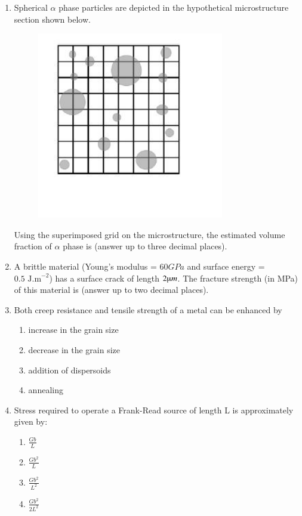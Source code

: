 \documentclass[journal]{IEEEtran}
\theoremstyle{remark}
\begin{document}
\begin{enumerate}
\item Spherical $\alpha$ phase particles are depicted in the hypothetical microstructure section shown below.
\begin{figure}[H]
    \centering
    \includegraphics[width=0.3\columnwidth]{figs/Q.15.png}
    \caption{}
    \label{fig:placeholder}
\end{figure}
Using the superimposed grid on the microstructure, the estimated volume fraction of $\alpha$ phase is \underline {\hspace{2cm}} (answer up to three decimal places). \hfill{}

\item A brittle material (Young's modulus = $60 GPa$ and surface energy = $0.5 \text{ J.m}^{-2}$) has a surface crack of length $2\micro m$. The fracture strength (in MPa) of this material is \underline {\hspace{2cm}} (answer up to two decimal places). \hfill{}

\item Both creep resistance and tensile strength of a metal can be enhanced by \hfill{}
\begin{multicols}{2}
\begin{enumerate}
    \item increase in the grain size
    \item decrease in the grain size
    \item addition of dispersoids
    \item annealing
\end{enumerate}
\end{multicols}

\item Stress required to operate a Frank-Read source of length L is approximately given by: \hfill{}
\begin{multicols}{4}
\begin{enumerate}
    \item $\frac{Gb}{L}$
    \item $\frac{Gb^2}{L}$
    \item $\frac{Gb^2}{L^2}$
    \item $\frac{Gb^2}{2L^2}$
\end{enumerate}
\end{multicols}


\end{enumerate}
\end{document}
